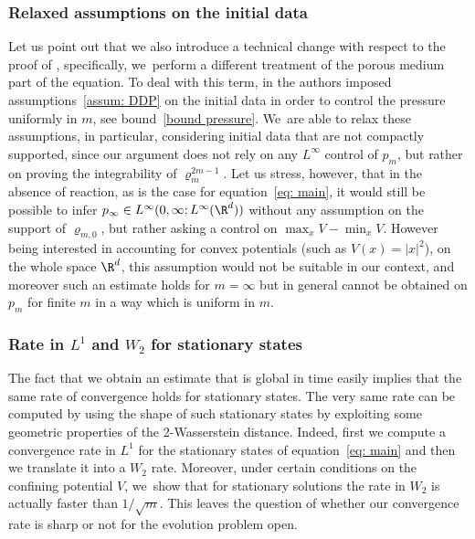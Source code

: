 \subsubsection*{Relaxed assumptions on the initial data}
Let us point out that we also introduce a technical change with respect to the proof of \cite[Th.\,1.1]{DDP2021}, specifically, we~perform a different treatment of the porous medium part of the equation. To deal with this term, in \cite{DDP2021} the authors imposed assumptions~\eqref{assum: DDP} on the initial data in order to control the pressure uniformly in $m$, see bound~\eqref{bound pressure}. We~are able to relax these assumptions, in particular, considering initial data that are not compactly supported, since our argument does not rely on any $L^\infty$ control of $p_m$, but rather on proving the integrability of $\varrho_m^{2m-1}$. Let us stress, however, that in the absence of reaction, as is the case for equation~\eqref{eq: main}, it would still be possible to infer $p_\infty \in L^\infty(0,\infty; L^\infty(\R^d))$ without any assumption on the support of $\varrho_{m,0}$, but rather asking a control on $\max_x V - \min_x V$. However being interested in accounting for convex potentials (such as $V(x)=|x|^2$), on the whole space $\R^d$, this assumption would not be suitable in our context, and moreover such an estimate holds for $m=\infty$ but in general cannot be obtained on $p_m$ for finite $m$ in a way which is uniform in $m$.

\subsubsection*{Rate in $L^1$ and $W_2$ for stationary states}
The fact that we obtain an estimate that is global in time easily implies that the same rate of convergence holds for stationary states. The very same rate can be computed by using the shape of such stationary states by exploiting some geometric properties of the 2-Wasserstein distance. Indeed, first we compute a convergence rate in $L^1$ for the stationary states of equation~\eqref{eq: main} and then we translate it into a $W_2$ rate. Moreover, under certain conditions on the confining potential $V$, we~show that for stationary solutions the rate in $W_2$ is actually faster than $1/\sqrt{m}$. This leaves the question of whether our convergence rate is sharp or not for the evolution problem open.


